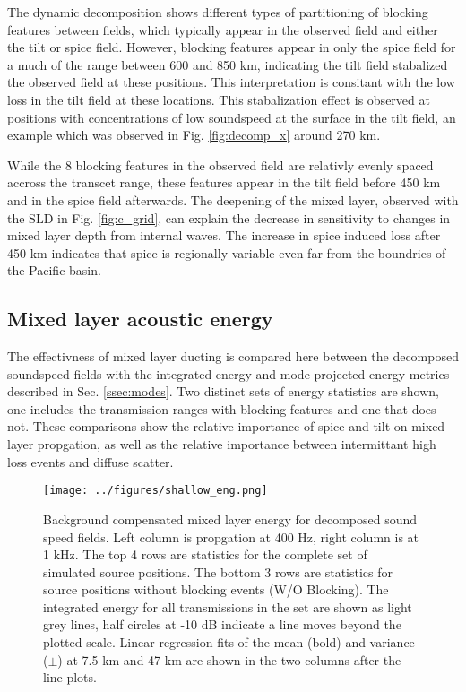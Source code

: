\documentclass[preprint,NumberedRefs]{JASA}
\begin{document}
The dynamic decomposition shows different types of partitioning of blocking features between fields, which typically appear in the observed field and either the tilt or spice field. However, blocking features appear in only the spice field for a much of the range between 600 and 850 km, indicating the tilt field stabalized the observed field at these positions. This interpretation is consitant with the low loss in the tilt field at these locations. This stabalization effect is observed at positions with concentrations of low soundspeed at the surface in the tilt field, an example which was observed in Fig. \ref{fig:decomp_x} around 270 km.

While the 8 blocking features in the observed field are relativly evenly spaced accross the transcet range, these features appear in the tilt field before 450 km and in the spice field afterwards. The deepening of the mixed layer, observed with the SLD in Fig. \ref{fig:c_grid}, can explain the decrease in sensitivity to changes in mixed layer depth from internal waves. The increase in spice induced loss after 450 km indicates that spice is regionally variable even far from the boundries of the Pacific basin.

\subsection{Mixed layer acoustic energy}
The effectivness of mixed layer ducting is compared here between the decomposed soundspeed fields with the integrated energy and mode projected energy metrics described in Sec. \ref{ssec:modes}. Two distinct sets of energy statistics are shown, one includes the transmission ranges with blocking features and one that does not. These comparisons show the relative importance of spice and tilt on mixed layer propgation, as well as the relative importance between intermittant high loss events and diffuse scatter.

\begin{figure}
\texttt{[image: ../figures/shallow\_eng.png]}
    \caption{Background compensated mixed layer energy for decomposed sound speed fields. Left column is propgation at 400 Hz, right column is at 1 kHz. The top 4 rows are statistics for the complete set of simulated source positions. The bottom 3 rows are statistics for source positions without blocking events (W/O Blocking). The integrated energy for all transmissions in the set are shown as light grey lines, half circles at -10 dB indicate a line moves beyond the plotted scale. Linear regression fits of the mean (bold) and variance ($\pm$) at 7.5 km and 47 km are shown in the two columns after the line plots.}
    \label{fig:shal_eng}
\end{figure}
\end{document}
